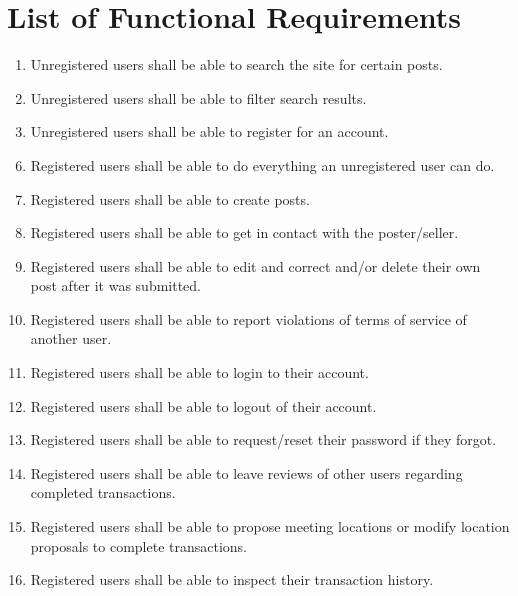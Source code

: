 \section{List of Functional Requirements}

\begin{description}[font=\itshape]
\item[Unregistered User]\hfill
    \begin{enumerate}
        \item Unregistered users shall be able to search the site for certain posts.
        \item Unregistered users shall be able to filter search results.
        \item Unregistered users shall be able to register for an account.
    \end{enumerate}
\item[Registered User]\hfill
    \begin{enumerate}
    	\setcounter{enumi}{5}
        \item Registered users shall be able to do everything an unregistered user can do.
        \item Registered users shall be able to create posts.
        \item Registered users shall be able to get in contact with the poster/seller. 
		\item Registered users shall be able to edit and correct and/or delete their own post after it was submitted.
		\item Registered users shall be able to report violations of terms of service of another user.
		\item Registered users shall be able to login to their account.
		\item Registered users shall be able to logout of their account.
		\item Registered users shall be able to request/reset their password if they forgot.
		\item Registered users shall be able to leave reviews of other users regarding completed transactions.
		\item Registered users shall be able to propose meeting locations or modify location proposals to complete transactions.
		\item Registered users shall be able to inspect their transaction history.
    \end{enumerate}
\item[Admin]\hfill
    \begin{enumerate}

\end{enumerate}
\end{description}
